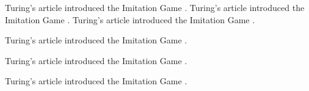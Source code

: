 Turing's article introduced the Imitation Game \parencite[p. 433]{Turing1950}.
Turing's article introduced the Imitation Game \parencite[p. 433]{Turing1950}.
Turing's article introduced the Imitation Game \parencite[p. 433]{Turing1950}.
\begin{frame}[t]
Turing's article introduced the Imitation Game \parencite[p. 433]{Turing1950}.
\end{frame}

\begin{frame}[t]
Turing's article introduced the Imitation Game \parencite[p. 433]{Turing1950}.
\end{frame}

\begin{frame}[t]
Turing's article introduced the Imitation Game \parencite[p. 433]{Turing1950}.
\end{frame}

